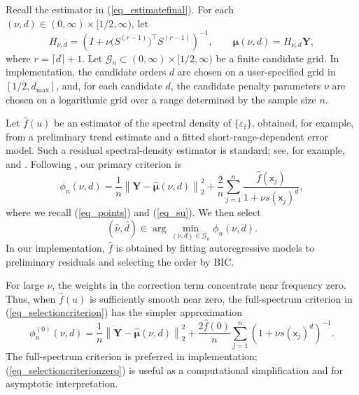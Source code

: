 \documentclass[11pt]{article}
\newcommand{\sfx}{\mathsf{x}}
\numberwithin{equation}{section}
\numberwithin{figure}{section}
\begin{document}
Recall the estimator in (\ref{eq_estimatefinal}). For each
\((\nu,d)\in(0,\infty)\times[1/2,\infty)\), let
\begin{equation*}
H_{\nu,d}
=
\left(
I+\nu\bigl(S^{(r-1)}\bigr)^{\top}S^{(r-1)}
\right)^{-1},
\qquad
\widehat{\bm{\mu}}(\nu,d)
=
H_{\nu,d}\bm{Y},
\end{equation*}
where \(r=\lceil d\rceil+1\). Let $\mathcal{G}_n
\subset
(0,\infty)\times[1/2,\infty)$ be a finite candidate grid. In implementation, the candidate orders \(d\)
are chosen on a user-specified grid in \([1/2,d_{\max}]\), and, for each
candidate \(d\), the candidate penalty parameters \(\nu\) are chosen on a
logarithmic grid over a range determined by the sample size \(n\).

Let $\widehat f(u)$ be an estimator of the spectral density of $\{\varepsilon_t\}$, obtained, for example, from a preliminary trend estimate and a fitted short-range-dependent error model.  Such a residual
spectral-density estimator is standard; see, for example,
\cite[Section 3]{burman_shumway2009estimation} and \cite{brockwell2016introduction}. Following \cite[Section 3]{burman_shumway2009estimation}, our primary criterion is
\begin{equation}\label{eq_selectioncriterion}
\phi_n(\nu,d)=\frac{1}{n}\left\|\bm{Y}-\widehat{\bm{\mu}}(\nu,d)\right\|_2^2+\frac{2}{n}\sum_{j=1}^n\frac{\widehat f(\sfx_j)}{1+\nu s(\sfx_j)^d},
\end{equation}
where we recall (\ref{eq_points}) and (\ref{eq_su}). 
We then select
\begin{equation}\label{eq_selectedparameters}
(\widehat\nu,\widehat d)\in\arg\min_{(\nu,d)\in\mathcal{G}_n}\phi_n(\nu,d).
\end{equation}
In our implementation, \(\widehat f\) is obtained by fitting autoregressive
models to preliminary residuals and selecting the order by BIC.

For large $\nu$, the weights in the correction term concentrate near frequency zero. Thus, when $\widehat f(u)$ is sufficiently smooth near zero, the full-spectrum criterion in (\ref{eq_selectioncriterion}) has the simpler approximation
\begin{equation}\label{eq_selectioncriterionzero}
\phi_n^{(0)}(\nu,d)=\frac{1}{n}\left\|\bm{Y}-\widehat{\bm{\mu}}(\nu,d)\right\|_2^2+\frac{2\widehat f(0)}{n}\sum_{j=1}^n\left(1+\nu s(\sfx_j)^d\right)^{-1}.
\end{equation}
The full-spectrum criterion is preferred in implementation; (\ref{eq_selectioncriterionzero}) is useful as a computational simplification and for asymptotic interpretation.
\end{document}
